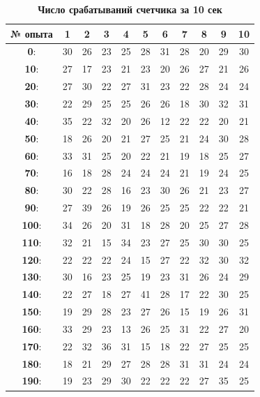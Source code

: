 \documentclass[a4paper, 12pt]{article}
\begin{document}
\begin{table}
\caption{\textbf{Число срабатываний счетчика за 10 сек}}
\begin{tabular}{|c|c|c|c|c|c|c|c|c|c|c|}
\hline 
\textbf{№ опыта} & \textbf{1} & \textbf{2} & \textbf{3} & \textbf{4} & \textbf{5} & \textbf{6} & \textbf{7} & \textbf{8} & \textbf{9} & \textbf{10} \\ 
\hline 
\textbf{0}: & 30 & 26 & 23 & 25 & 28 & 31 & 28 & 20 & 29 & 30 \\ 
\hline 
\textbf{10}: & 27 & 17 & 23 & 21 & 23 & 20 & 26 & 27 & 21 & 26 \\ 
\hline 
\textbf{20}: & 27 & 30 & 22 & 27 & 31 & 23 & 22 & 28 & 24 & 24 \\ 
\hline 
\textbf{30}: & 22 & 29 & 25 & 25 & 26 & 26 & 18 & 30 & 32 & 31 \\ 
\hline\hline
\textbf{40}: & 35 & 22 & 32 & 20 & 26 & 12 & 22 & 22 & 20 & 21 \\ 
\hline 
\textbf{50}: & 18 & 26 & 20 & 21 & 27 & 25 & 21 & 24 & 30 & 28 \\ 
\hline 
\textbf{60}: & 33 & 31 & 25 & 20 & 22 & 21 & 19 & 18 & 25 & 27 \\ 
\hline 
\textbf{70}: & 16 & 18 & 28 & 24 & 24 & 24 & 21 & 19 & 24 & 25 \\ 
\hline\hline 
\textbf{80}: & 30 & 22 & 28 & 16 & 23 & 30 & 26 & 21 & 23 & 27 \\ 
\hline 
\textbf{90}: & 27 & 39 & 26 & 19 & 26 & 25 & 25 & 22 & 22 & 21 \\ 
\hline 
\textbf{100}: & 34 & 26 & 20 & 31 & 18 & 28 & 20 & 25 & 27 & 28 \\ 
\hline 
\textbf{110}: & 32 & 21 & 15 & 34 & 23 & 27 & 25 & 30 & 30 & 25\\
\hline\hline
\textbf{120}: & 22 & 22 & 22 & 24 & 15 & 27 & 22 & 32 & 30 & 32 \\ 
\hline 
\textbf{130}: & 30 & 16 & 23 & 25 & 19 & 23 & 31 & 26 & 24 & 29 \\ 
\hline 
\textbf{140}: & 22 & 27 & 18 & 27 & 41 & 28 & 17 & 22 & 30 & 25 \\ 
\hline 
\textbf{150}: & 19 & 29 & 28 & 23 & 27 & 26 & 15 & 19 & 26 & 31 \\ 
\hline\hline
\textbf{160}: & 33 & 29 & 23 & 13 & 26 & 25 & 31 & 22 & 27 & 20 \\ 
\hline 
\textbf{170}: & 22 & 32 & 36 & 31 & 15 & 18 & 22 & 27 & 25 & 25 \\ 
\hline 
\textbf{180}: & 18 & 21 & 29 & 27 & 28 & 28 & 31 & 31 & 24 & 24 \\ 
\hline 
\textbf{190}: & 19 & 23 & 29 & 30 & 22 & 22 & 22 & 27 & 35 & 25 \\ 
\hline 
\end{tabular}
\end{table}
\end{document}

